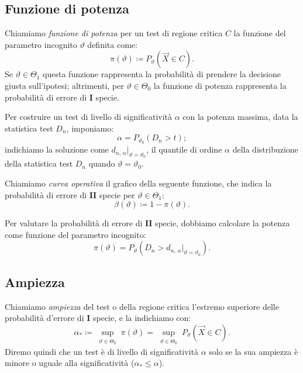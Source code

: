         \subsection{Funzione di potenza}
            \begin{defn}
                Chiamiamo \emph{funzione di potenza} per un test di regione critica $C$ la funzione del 
                parametro incognito $\vartheta$ definita come: \[
                    \pi(\vartheta) \coloneqq P_\vartheta(\vec{X} \in C)
                .\] Se $\vartheta \in \Theta_1$ questa funzione rappresenta la probabilità di prendere la 
                decisione giusta sull'ipotesi; altrimenti, per $\vartheta \in \Theta_0$ la funzione di 
                potenza rappresenta la probabilità di errore di $\mathbf{I}$ specie.
            \end{defn}
            \begin{obsv}
                Per costruire un test di livello di significatività $\alpha$ con la potenza massima, data la 
                statistica test $D_n$, imponiamo: \[
                    \alpha = P_{\vartheta_0}(D_n > t)
                ;\] indichiamo la soluzione come $d_{n,\,\alpha}|_{\vartheta=\vartheta_0}$, il quantile di 
                ordine $\alpha$ della distribuzione della statistica test $D_n$ quando $\vartheta=\vartheta_0$.
            \end{obsv}
            \begin{defn}
                Chiamiamo \emph{curva operativa} il grafico della seguente funzione, che indica la 
                probabilità di errore di $\mathbf{II}$ specie per $\vartheta \in \Theta_1$: \[
                    \beta(\vartheta) \coloneqq 1 - \pi(\vartheta)
                .\] 
            \end{defn}
            \begin{obsv}
                Per valutare la probabilità di errore di $\mathbf{II}$ specie, dobbiamo calcolare la potenza 
                come funzione del parametro incognito: \[
                    \pi(\vartheta) = P_\vartheta(D_n > d_{n,\,\alpha}|_{\vartheta=\vartheta_0})
                .\]
            \end{obsv}
        \subsection{Ampiezza}
            \begin{defn}
                Chiamiamo \emph{ampiezza} del test o della regione critica l'estremo superiore delle 
                probabilità d'errore di $\mathbf{I}$ specie, e la indichiamo con: \[
                    \alpha_* \coloneqq \sup_{\substack{\vartheta \in \Theta_0}} \pi(\vartheta) 
                    = \sup_{\substack{\vartheta \in \Theta_0}} P_\vartheta(\vec{X} \in C)
                .\] Diremo quindi che un test è di livello di significatività $\alpha$ solo se la sua ampiezza 
                è minore o uguale alla significatività ($\alpha_* \leq \alpha$).
            \end{defn}
